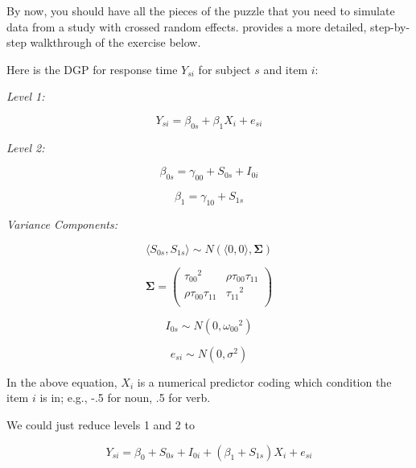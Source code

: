 \documentclass[]{book}
\begin{document}
By now, you should have all the pieces of the puzzle that you need to simulate data from a study with crossed random effects. \citet{Debruine_Barr_2020} provides a more detailed, step-by-step walkthrough of the exercise below.

Here is the DGP for response time \(Y_{si}\) for subject \(s\) and item \(i\):

\emph{Level 1:}

\begin{equation}
Y_{si} = \beta_{0s} + \beta_{1} X_{i} + e_{si}
\end{equation}

\emph{Level 2:}

\begin{equation}
\beta_{0s} = \gamma_{00} + S_{0s} + I_{0i}
\end{equation}

\begin{equation}
\beta_{1} = \gamma_{10} + S_{1s}
\end{equation}

\emph{Variance Components:}

\begin{equation}
\langle S_{0s}, S_{1s} \rangle \sim N\left(\langle 0, 0 \rangle, \mathbf{\Sigma}\right) 
\end{equation}

\begin{equation}
\mathbf{\Sigma} = \left(\begin{array}{cc}{\tau_{00}}^2 & \rho\tau_{00}\tau_{11} \\
         \rho\tau_{00}\tau_{11} & {\tau_{11}}^2 \\
         \end{array}\right) 
\end{equation}

\begin{equation}
I_{0s} \sim N\left(0, {\omega_{00}}^2\right) 
\end{equation}

\begin{equation}
e_{si} \sim N\left(0, \sigma^2\right)
\end{equation}

In the above equation, \(X_i\) is a numerical predictor coding which condition the item \(i\) is in; e.g., -.5 for noun, .5 for verb.

We could just reduce levels 1 and 2 to

\[Y_{si} = \beta_0 + S_{0s} + I_{0i} + (\beta_1 + S_{1s})X_{i} + e_{si}\]
\end{document}
